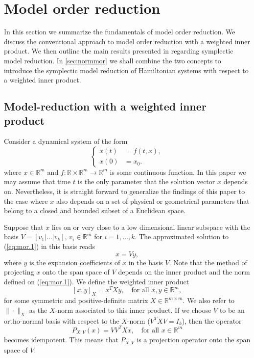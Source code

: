 \section{Model order reduction}
\label{sec:mor}

In this section we summarize the fundamentals of model order reduction. We discuss the conventional approach to model order reduction with a weighted inner product. We then outline the main results presented in \cite{doi:10.1137/17M1111991} regarding symplectic model reduction. In \cref{sec:normmor} we shall combine the two concepts to introduce the symplectic model reduction of Hamiltonian systems with respect to a weighted inner product.

\subsection{Model-reduction with a weighted inner product} \label{sec:mor.1}
Consider a dynamical system of the form
\begin{equation} \label{eq:mor.1}
\left\{
\begin{aligned}
	\dot x(t) &= f(t,x), \\
	x(0) &= x_0.
\end{aligned}
\right.
\end{equation}
where $x\in \mathbb R^{m}$ and $f:\mathbb R \times \mathbb R^{m} \to \mathbb R^{m}$ is some continuous function. In this paper we may assume that time $t$ is the only parameter that the solution vector $x$ depends on. Nevertheless, it is straight forward to generalize the findings of this paper to the case where $x$ also depends on a set of physical or geometrical parameters that belong to a closed and bounded subset of a Euclidean space.

Suppose that $x$ lies on or very close to a low dimensional linear subspace with the basis $V=[v_1|\dots|v_k]$, $v_i\in \mathbb R^{m}$ for $i=1,\dots,k$. The approximated solution to (\ref{eq:mor.1}) in this basis reads
\begin{equation} \label{eq:mor.2}
	x = Vy,
\end{equation}
where $y$ is the expansion coefficients of $x$ in the basis $V$. Note that the method of projecting $x$ onto the span space of $V$ depends on the inner product and the norm defined on (\ref{eq:mor.1}). We define the weighted inner product
\begin{equation} \label{eq:mor.3}
	[x,y]_X = x^TXy,\quad \text{for all } x,y \in \mathbb R^m,
\end{equation}
for some symmetric and positive-definite matrix $X\in \mathbb{R}^{m\times m}$. We also refer to $\|\cdot \|_X$ as the $X$-norm associated to this inner product. If we choose $V$ to be an ortho-normal basis with respect to the $X$-norm ($V^TXV=I_k$), then the operator
\begin{equation} \label{eq:mor.4}
	P_{X,V}(x) = VV^TXx, \quad \text{for all } x\in \mathbb R^{m}
\end{equation}
becomes idempotent. This means that $P_{X,V}$ is a projection operator onto the span space of $V$.

